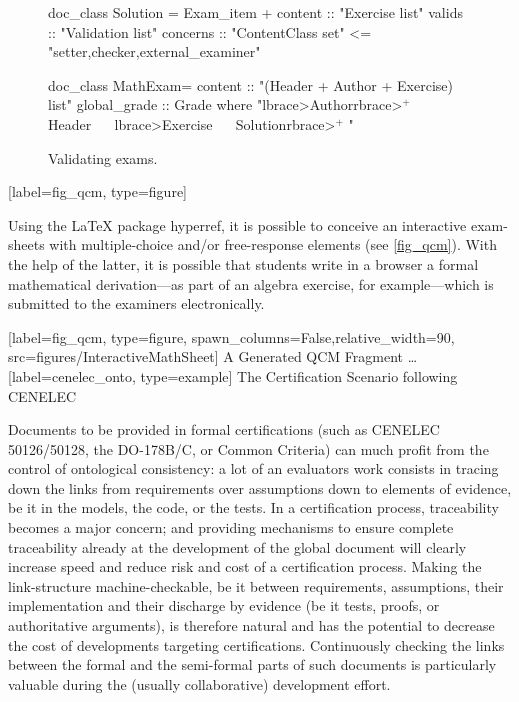 \begin{isabellebody}
\begin{isamarkuptext}
\begin{figure}
\begin{isar}
doc_class Solution = Exam_item +
  content  :: "Exercise list"
  valids   :: "Validation list"
  concerns :: "ContentClass set" <= "{setter,checker,external_examiner}"
  
doc_class MathExam=
  content :: "(Header + Author + Exercise) list"
  global_grade :: Grade 
  where "\<lbrace>Author\<rbrace>$^+$  ~~  Header ~~  \<lbrace>Exercise ~~ Solution\<rbrace>$^+$ "
\end{isar}
\caption{Validating exams.}
\label{fig:onto-exam-monitor}
\end{figure}%
\end{isamarkuptext}\isamarkuptrue%
%
\isaDofDeclareReferenceFigure%
%
[label={{fig_qcm}}, type={figure}]%
%
\begin{isamarkuptext}%
Using the \LaTeX{} package hyperref, it is possible to conceive an interactive 
exam-sheets with multiple-choice and/or free-response elements 
(see \autoref{fig_qcm}). With the 
help of the latter, it is possible that students write in a browser a formal mathematical 
derivation---as part of an algebra exercise, for example---which is submitted to the examiners 
electronically.%
\end{isamarkuptext}\isamarkuptrue%
%
%
\isaDofFigure%
%
[label={fig_qcm}, type={figure}, spawn_columns=False,relative_width={90},
        src={figures/InteractiveMathSheet}]%
{A Generated QCM Fragment \ldots}%
%
\isaDofSubsectionExample%
%
[label={cenelec_onto}, type={example}]%
{The Certification Scenario following CENELEC}%
%
\begin{isamarkuptext}%
Documents to be provided in formal certifications (such as CENELEC
50126/50128, the DO-178B/C, or Common Criteria) can much profit from the control of ontological consistency: 
a lot of an evaluators work consists in tracing down the links from requirements over 
assumptions down to elements of evidence, be it in the models, the code, or the tests. 
In a certification process, traceability becomes a major concern; and providing
mechanisms to ensure complete traceability already at the development of the
global document will clearly increase speed and reduce risk and cost of a
certification process. Making the link-structure machine-checkable, be it between requirements, 
assumptions, their implementation and their discharge by evidence (be it tests, proofs, or
authoritative arguments), is therefore natural and has the potential to decrease the cost 
of developments targeting certifications. Continuously checking the links between the formal
and the semi-formal parts of such documents is particularly valuable during the (usually
collaborative) development effort. 


\end{isamarkuptext}
\end{isabellebody}
